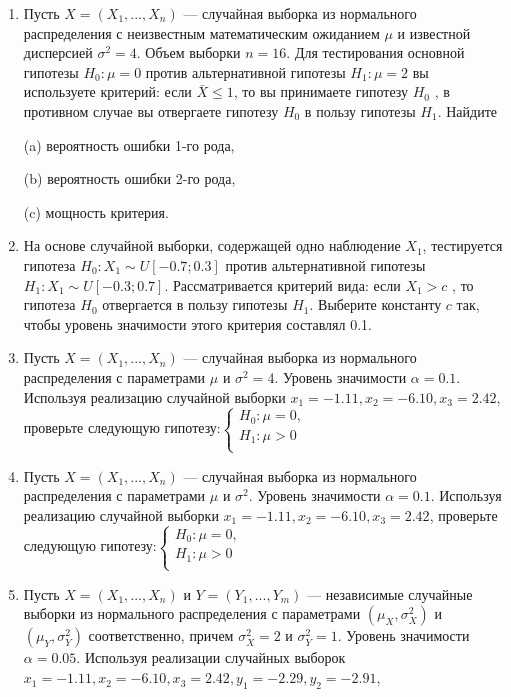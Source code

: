 \documentclass[12pt]{article}
\begin{document}
\begin{enumerate}
\item Пусть $X = (X_{1},..., X_{n})$ — случайная выборка из нормального распределения с неизвестным математическим ожиданием $\mu$ и известной дисперсией $\sigma^2 = 4$. Объем выборки $n = 16$. Для тестирования основной гипотезы $H_{0}:\mu = 0$ против
альтернативной гипотезы $H_{1}:\mu = 2$ вы используете критерий: если $\bar{X} \leq 1$, то вы принимаете гипотезу $H_{0}$ , в противном случае вы отвергаете гипотезу $H_{0}$ в пользу гипотезы $H_{1}$. Найдите

\hspace*{0.6cm}(a) вероятность ошибки 1-го рода, 

\hspace*{0.6cm}(b) вероятность ошибки 2-го рода,

\hspace*{0.6cm}(c) мощность критерия.

\item На основе случайной выборки, содержащей одно наблюдение $X_{1}$, тестируется гипотеза $H_{0} : X_{1} \sim U[-0.7;0.3]$ против альтернативной гипотезы $H_{1}: X_{1} \sim U[-0.3;0.7]$. Рассматривается критерий вида: если $X_{1} > c$ , то гипотеза $H_{0}$ отвергается в пользу гипотезы $H_{1}$. Выберите константу $c$ так, чтобы уровень значимости этого критерия составлял 0.1.

\item Пусть $X = (X_{1},..., X_{n})$ — случайная выборка из нормального распределения с параметрами $\mu$ и $\sigma^2 = 4$. Уровень значимости  $\alpha = 0.1$. Используя
реализацию случайной выборки $x_{1} = -1.11, x_{2} = -6.10, x_{3} = 2.42$, проверьте следующую гипотезу:$\begin{cases}
H_{0}:\mu = 0, \\
H_{1}:\mu > 0 \\
\end{cases}$

\item Пусть $X = (X_{1},..., X_{n})$ — случайная выборка из нормального распределения с параметрами $\mu$ и $\sigma^2$. Уровень значимости  $\alpha = 0.1$. Используя
реализацию случайной выборки $x_{1} = -1.11, x_{2} = -6.10, x_{3} = 2.42$, проверьте следующую гипотезу:$\begin{cases}
H_{0}:\mu = 0, \\
H_{1}:\mu > 0 \\
\end{cases}$

\item Пусть $X = (X_{1},..., X_{n})$ и $Y = (Y_{1},..., Y_{m})$ — независимые случайные
выборки из нормального распределения с параметрами $(\mu_{X},\sigma^2_{X})$ и $(\mu_{Y},\sigma^2_{Y})$ соответственно, причем  $\sigma^2_{X} = 2$ и $\sigma^2_{Y} = 1$. Уровень значимости $\alpha = 0.05$. Используя реализации случайных выборок\newline
\hspace*{3cm}$x_{1} = -1.11, x_{2} = -6.10, x_{3} = 2.42, y_{1} = -2.29, y_{2} = -2.91$,


\end{enumerate}
\end{document}
